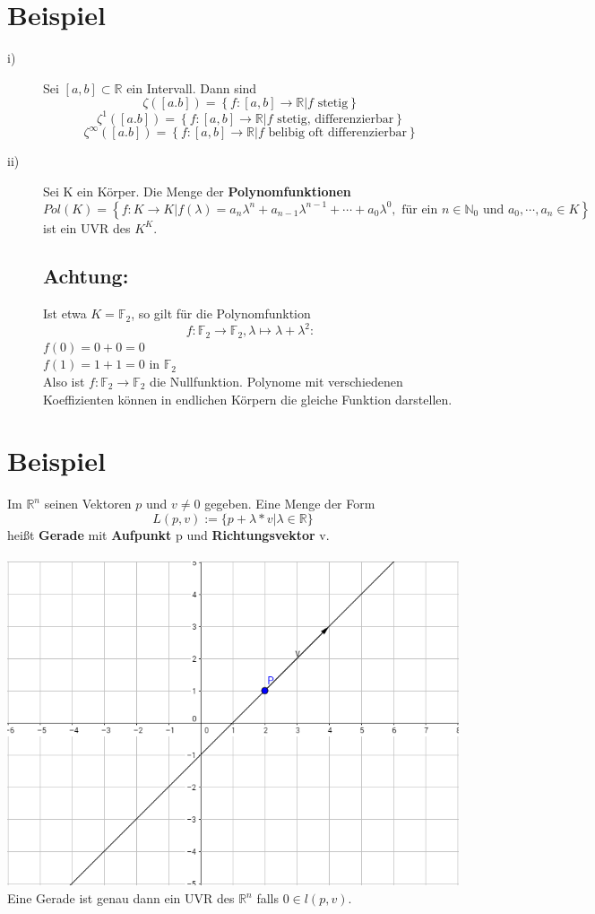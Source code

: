 \documentclass{scrbook}
\begin{document}
\section{Beispiel}
\begin{description}
\item[i)] Sei \([a,b] \subset \mathbb{R}\) ein Intervall. Dann sind
\[
\zeta ([a.b]) = \left\{ f:[a,b] \rightarrow \mathbb{R} | f\text{ stetig}\right\}
\]
\[
\zeta^1 ([a.b]) = \left\{ f:[a,b] \rightarrow \mathbb{R} | f\text{ stetig, differenzierbar}\right\}
\]
\[
\zeta^{\infty} ([a.b]) = \left\{ f:[a,b] \rightarrow \mathbb{R} | f\text{ belibig oft differenzierbar}\right\}
\]
\item[ii)]Sei K ein Körper. Die Menge der \textbf{Polynomfunktionen} 
\[
Pol(K)=\left\{ f:K\rightarrow K| f(\lambda ) = a_n\lambda^n + a_{n-1}\lambda^{n-1}+\cdots+a_0\lambda^0, \text{ für ein }n\in \mathbb{N}_0 \text{ und } a_0,\cdots ,a_n \in K   \right\}
\]
ist ein UVR des \(K^K\).
\subsection*{Achtung:}
Ist etwa \(K=\mathbb{F}_2\), so gilt für die Polynomfunktion \[f:\mathbb{F}_2 \rightarrow \mathbb{F}_2, \lambda\mapsto \lambda + \lambda^2:\]
\(f(0) = 0+0 =0\)\\
\(f(1) = 1+1=0\) in \(\mathbb{F}_2\)\\
Also ist \(f:\mathbb{F}_2 \rightarrow \mathbb{F}_2\) die Nullfunktion. Polynome mit verschiedenen Koeffizienten können in endlichen Körpern die gleiche Funktion darstellen.
\end{description}
\section{Beispiel}
Im \(\mathbb{R}^n\) seinen Vektoren \(p\) und \(v \neq 0\) gegeben. Eine Menge der Form\[L(p,v) := \{p+\lambda * v|\lambda\in\mathbb{R}\}\]
heißt \textbf{Gerade} mit \textbf{Aufpunkt} p und \textbf{Richtungsvektor} v.\\\\
\includegraphics[width=\textwidth]{Graph1.png}\\
Eine Gerade ist genau dann ein UVR des \(\mathbb{R}^n\) falls \(0\in l(p,v)\).
\end{document}
